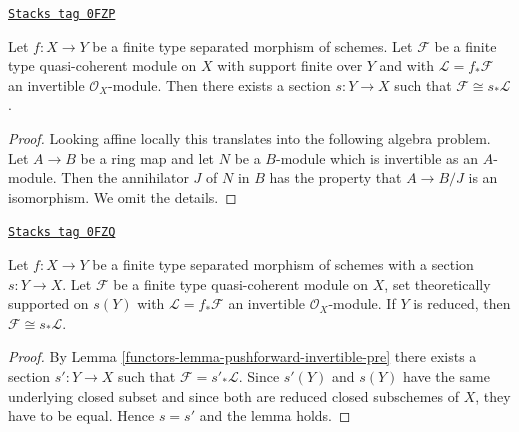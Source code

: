 \begin{lemma}
\label{functors-lemma-pushforward-invertible-pre}
\href{https://stacks.math.columbia.edu/tag/0FZP}{\texttt{Stacks tag 0FZP}}

Let $f : X \to Y$ be a finite type separated morphism of schemes. Let
$\mathcal{F}$ be a finite type quasi-coherent module on $X$
with support finite over $Y$
and with $\mathcal{L} = f_*\mathcal{F}$ an invertible $\mathcal{O}_X$-module.
Then there exists a section $s : Y \to X$ such that
$\mathcal{F} \cong s_*\mathcal{L}$.
\end{lemma}

\begin{proof}
Looking affine locally this translates into the following algebra problem.
Let $A \to B$ be a ring map and let $N$ be a $B$-module which is
invertible as an $A$-module. Then the annihilator $J$ of $N$ in $B$
has the property that $A \to B/J$ is an isomorphism. We omit the details.
\end{proof}

\begin{lemma}
\label{functors-lemma-pushforward-invertible}
\href{https://stacks.math.columbia.edu/tag/0FZQ}{\texttt{Stacks tag 0FZQ}}

Let $f : X \to Y$ be a finite type separated morphism of schemes with a section
$s : Y \to X$. Let $\mathcal{F}$ be a finite type quasi-coherent module
on $X$, set theoretically supported on $s(Y)$ with
$\mathcal{L} = f_*\mathcal{F}$
an invertible $\mathcal{O}_X$-module. If $Y$ is reduced, then
$\mathcal{F} \cong s_*\mathcal{L}$.
\end{lemma}

\begin{proof}

By Lemma \ref{functors-lemma-pushforward-invertible-pre}
there exists a section $s' : Y  \to X$ such that
$\mathcal{F} = s'_*\mathcal{L}$. Since $s'(Y)$ and $s(Y)$
have the same underlying closed subset
and since both are reduced closed subschemes of $X$, they have to be equal.
Hence $s = s'$ and the lemma holds.
\end{proof}

